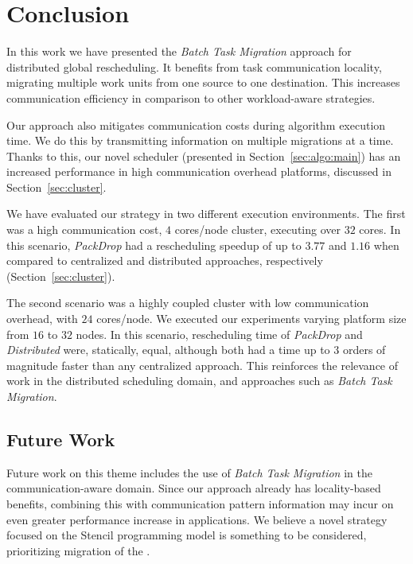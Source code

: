 \section{Conclusion} \label{sec:conclusion}

In this work we have presented the \textit{Batch Task Migration} approach for distributed global rescheduling.
It benefits from task communication locality, migrating multiple work units from one source to one destination.
This increases communication efficiency in comparison to other workload-aware strategies.

Our approach also mitigates communication costs during algorithm execution time.
We do this by transmitting information on multiple migrations at a time.
Thanks to this, our novel scheduler (presented in Section~\ref{sec:algo:main}) has an increased performance in high communication overhead platforms, discussed in Section~\ref{sec:cluster}.

We have evaluated our strategy in two different execution environments. 
The first was a high communication cost, $4$ cores/node cluster, executing over $32$ cores.
In this scenario, \textit{PackDrop} had a rescheduling speedup of up to $3.77$ and $1.16$ when compared to centralized and distributed approaches, respectively (Section~\ref{sec:cluster}).

The second scenario was a highly coupled cluster with low communication overhead, with $24$ cores/node.
We executed our experiments varying platform size from $16$ to $32$ nodes.
In this scenario, rescheduling time of \textit{PackDrop} and \textit{Distributed} were, statically, equal, although both had a time up to $3$ orders of magnitude faster than any centralized approach.
This reinforces the relevance of work in the distributed scheduling domain, and approaches such as \textit{Batch Task Migration}.

\subsection{Future Work}

Future work on this theme includes the use of \textit{Batch Task Migration} in the communication-aware domain.
Since our approach already has locality-based benefits, combining this with communication pattern information may incur on even greater performance increase in applications.
We believe a novel strategy focused on the Stencil programming model is something to be considered, prioritizing migration of the .

